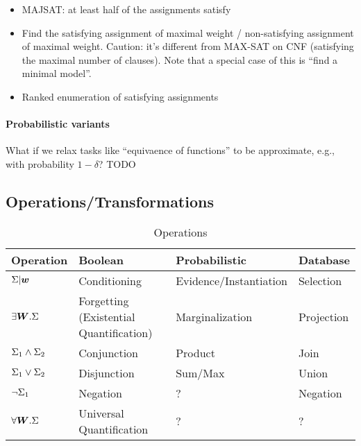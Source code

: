 \begin{itemize}
    \item MAJSAT: at least half of the assignments satisfy
    \item Find the satisfying assignment of maximal weight / non-satisfying assignment of maximal weight. Caution: it's different from MAX-SAT on CNF (satisfying the maximal number of clauses). Note that a special case of this is ``find a minimal model''.
    \item Ranked enumeration of satisfying assignments
\end{itemize}

\paragraph*{Probabilistic variants}
What if we relax tasks like ``equivaence of functions'' to be approximate, e.g., with probability $1-\delta$? TODO

\subsection{Operations/Transformations}
\label{sec:operations}


\begin{table}[]
\centering
\begin{tabular}{@{}llll@{}}
\toprule
\textbf{Operation} & \textbf{Boolean}         & \textbf{Probabilistic} & \textbf{Database} \\ \midrule
$\Sigma | \bm{w}$        & Conditioning             & Evidence/Instantiation & Selection         \\
$\exists \bm{W}. \Sigma$                   & Forgetting (Existential Quantification)               & Marginalization        & Projection        \\
$\Sigma_1 \wedge \Sigma_2$                     & Conjunction              & Product                & Join              \\
$\Sigma_1 \vee \Sigma_2$                  & Disjunction              & Sum/Max                & Union             \\
$\neg \Sigma_1$                   & Negation                 & ?                      & Negation          \\
$\forall \bm{W}. \Sigma$                     & Universal Quantification & ?                      &   ?                \\ \bottomrule
\end{tabular}
\label{tbl:operations}
\caption{Operations}
\end{table}

